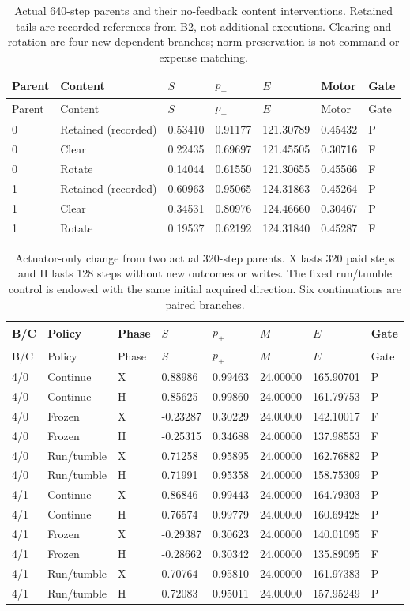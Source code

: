 \begin{longtable}{lllllll}
\caption{Actual 640-step parents and their no-feedback content interventions. Retained tails are recorded references from B2, not additional executions. Clearing and rotation are four new dependent branches; norm preservation is not command or expense matching.}\label{tab:scalar-content}\\
\toprule
Parent & Content & $S$ & $p_+$ & $E$ & Motor & Gate \\
\midrule
\endfirsthead
\toprule
Parent & Content & $S$ & $p_+$ & $E$ & Motor & Gate \\
\midrule
\endhead
0 & Retained (recorded) & 0.53410 & 0.91177 & 121.30789 & 0.45432 & P \\
0 & Clear & 0.22435 & 0.69697 & 121.45505 & 0.30716 & F \\
0 & Rotate & 0.14044 & 0.61550 & 121.30655 & 0.45566 & F \\
1 & Retained (recorded) & 0.60963 & 0.95065 & 124.31863 & 0.45264 & P \\
1 & Clear & 0.34531 & 0.80976 & 124.46660 & 0.30467 & P \\
1 & Rotate & 0.19537 & 0.62192 & 124.31840 & 0.45287 & F \\
\bottomrule
\end{longtable}
\begin{longtable}{llllllll}
\caption{Actuator-only change from two actual 320-step parents. X lasts 320 paid steps and H lasts 128 steps without new outcomes or writes. The fixed run/tumble control is endowed with the same initial acquired direction. Six continuations are paired branches.}\label{tab:scalar-actuator}\\
\toprule
B/C & Policy & Phase & $S$ & $p_+$ & $M$ & $E$ & Gate \\
\midrule
\endfirsthead
\toprule
B/C & Policy & Phase & $S$ & $p_+$ & $M$ & $E$ & Gate \\
\midrule
\endhead
4/0 & Continue & X & 0.88986 & 0.99463 & 24.00000 & 165.90701 & P \\
4/0 & Continue & H & 0.85625 & 0.99860 & 24.00000 & 161.79753 & P \\
4/0 & Frozen & X & -0.23287 & 0.30229 & 24.00000 & 142.10017 & F \\
4/0 & Frozen & H & -0.25315 & 0.34688 & 24.00000 & 137.98553 & F \\
4/0 & Run/tumble & X & 0.71258 & 0.95895 & 24.00000 & 162.76882 & P \\
4/0 & Run/tumble & H & 0.71991 & 0.95358 & 24.00000 & 158.75309 & P \\
4/1 & Continue & X & 0.86846 & 0.99443 & 24.00000 & 164.79303 & P \\
4/1 & Continue & H & 0.76574 & 0.99779 & 24.00000 & 160.69428 & P \\
4/1 & Frozen & X & -0.29387 & 0.30623 & 24.00000 & 140.01095 & F \\
4/1 & Frozen & H & -0.28662 & 0.30342 & 24.00000 & 135.89095 & F \\
4/1 & Run/tumble & X & 0.70764 & 0.95810 & 24.00000 & 161.97383 & P \\
4/1 & Run/tumble & H & 0.72083 & 0.95011 & 24.00000 & 157.95249 & P \\
\bottomrule
\end{longtable}
\endgroup
